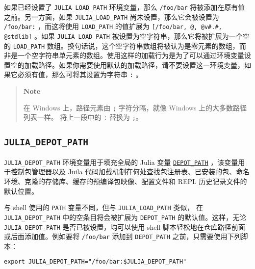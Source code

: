 如果已经设置了 \texttt{JULIA\_LOAD\_PATH} 环境变量，那么 \texttt{/foo/bar} 将被添加在原有值之前。另一方面，如果 \texttt{JULIA\_LOAD\_PATH} 尚未设置，那么它会被设置为 \texttt{/foo/bar:} ，而这将使用 \texttt{LOAD\_PATH} 的值扩展为 \texttt{[{\textquotedbl}/foo/bar{\textquotedbl}, {\textquotedbl}@{\textquotedbl}, {\textquotedbl}@v\#.\#{\textquotedbl}, {\textquotedbl}@stdlib{\textquotedbl}]} 。如果 \texttt{JULIA\_LOAD\_PATH} 被设置为空字符串，那么它将被扩展为一个空的 \texttt{LOAD\_PATH} 数组。换句话说，这个空字符串数组将被认为是零元素的数组，而非是一个空字符串单元素的数组。使用这样的加载行为是为了可以通过环境变量设置空的加载路径。如果你需要使用默认的加载路径，请不要设置这一环境变量，如果它必须有值，那么可将其设置为字符串 \texttt{:} 。



\begin{quote}
\textbf{Note}

在 Windows 上，路径元素由 \texttt{;} 字符分隔，就像 Windows 上的大多数路径列表一样。 将上一段中的 \texttt{:} 替换为 \texttt{;}。

\end{quote}


\hypertarget{7415777056556214668}{}


\subsection{\texttt{JULIA\_DEPOT\_PATH}}



\texttt{JULIA\_DEPOT\_PATH} 环境变量用于填充全局的 Julia 变量 \hyperlink{15271486679944781836}{\texttt{DEPOT\_PATH}} ，该变量用于控制包管理器以及 Juila 代码加载机制在何处查找包注册表、已安装的包、命名环境、克隆的存储库、缓存的预编译包映像、配置文件和 REPL 历史记录文件的默认位置。



与 shell 使用的 \texttt{PATH} 变量不同，但与 \texttt{JULIA\_LOAD\_PATH} 类似， 在 \texttt{JULIA\_DEPOT\_PATH} 中的空条目将会被扩展为 \texttt{DEPOT\_PATH} 的默认值。这样，无论 \texttt{JULIA\_DEPOT\_PATH} 是否已被设置，均可以使用 shell 脚本轻松地在仓库路径前面或后面添加值。例如要将 \texttt{/foo/bar} 添加到 \texttt{DEPOT\_PATH} 之前，只需要使用下列脚本：




\begin{lstlisting}
export JULIA_DEPOT_PATH="/foo/bar:$JULIA_DEPOT_PATH"
\end{lstlisting}



